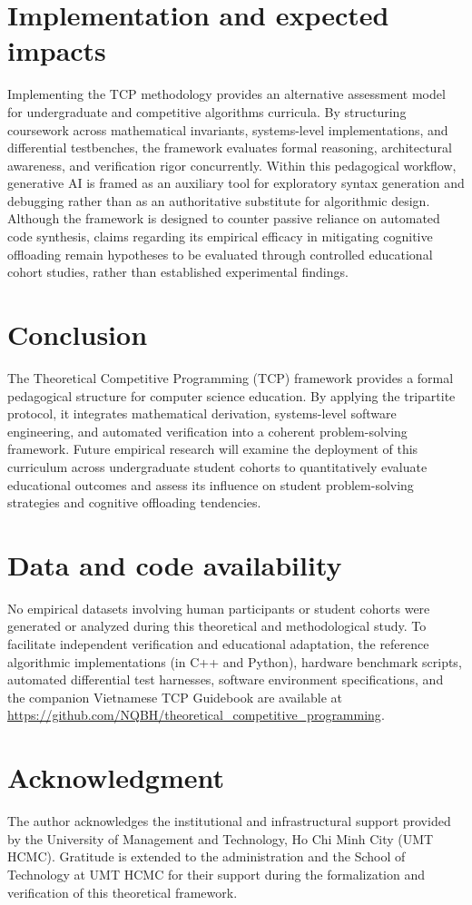 \documentclass[10pt, letterpaper]{article}
\begin{document}
\section{Implementation and expected impacts}\label{sec:implementation}
Implementing the TCP methodology provides an alternative assessment model for undergraduate and competitive algorithms curricula. By structuring coursework across mathematical invariants, systems-level implementations, and differential testbenches, the framework evaluates formal reasoning, architectural awareness, and verification rigor concurrently. Within this pedagogical workflow, generative AI is framed as an auxiliary tool for exploratory syntax generation and debugging rather than as an authoritative substitute for algorithmic design. Although the framework is designed to counter passive reliance on automated code synthesis, claims regarding its empirical efficacy in mitigating cognitive offloading remain hypotheses to be evaluated through controlled educational cohort studies, rather than established experimental findings.

\section{Conclusion}\label{sec:conclusion}
The Theoretical Competitive Programming (TCP) framework provides a formal pedagogical structure for computer science education. By applying the tripartite protocol, it integrates mathematical derivation, systems-level software engineering, and automated verification into a coherent problem-solving framework. Future empirical research will examine the deployment of this curriculum across undergraduate student cohorts to quantitatively evaluate educational outcomes and assess its influence on student problem-solving strategies and cognitive offloading tendencies.

\section*{Data and code availability}
No empirical datasets involving human participants or student cohorts were generated or analyzed during this theoretical and methodological study. To facilitate independent verification and educational adaptation, the reference algorithmic implementations (in C++ and Python), hardware benchmark scripts, automated differential test harnesses, software environment specifications, and the companion Vietnamese TCP Guidebook are available at \url{https://github.com/NQBH/theoretical_competitive_programming}.

\section*{Acknowledgment}
The author acknowledges the institutional and infrastructural support provided by the University of Management and Technology, Ho Chi Minh City (UMT HCMC). Gratitude is extended to the administration and the School of Technology at UMT HCMC for their support during the formalization and verification of this theoretical framework.

\printbibliography
\end{document}
